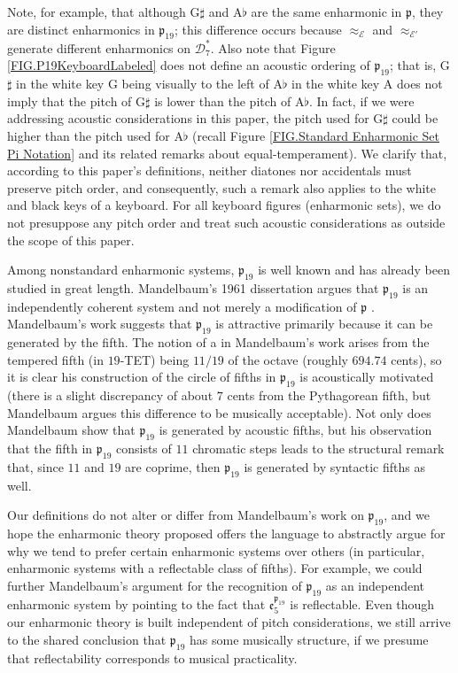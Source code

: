 \documentclass{article}
\theoremstyle{plain}
\theoremstyle{definition}
\theoremstyle{remark}
\begin{document}
Note, for example, that although $\textrm{G}\sharp$ and $\textrm{A}\flat$ are the same enharmonic in $\mathfrak{p}$, they are distinct enharmonics in $\mathfrak{p}_{19}$; this difference occurs because $\approx_\mathcal{E}$ and $\approx_{\mathcal{E}'}$ generate different enharmonics on $\mathcal{D}_7^\ast$. Also note that Figure \ref{FIG.P19KeyboardLabeled} does not define an acoustic ordering of $\mathfrak{p}_{19}$; that is, G$\sharp$ in the white key G being visually to the left of A$\flat$ in the white key A does not imply that the pitch of G$\sharp$ is lower than the pitch of A$\flat$. In fact, if we were addressing acoustic considerations in this paper, the pitch used for G$\sharp$ could be higher than the pitch used for A$\flat$ (recall Figure \ref{FIG.Standard Enharmonic Set Pi Notation} and its related remarks about equal-temperament). We clarify that, according to this paper's definitions, neither diatones nor accidentals must preserve pitch order, and consequently, such a remark also applies to the white and black keys of a keyboard. For all keyboard figures (enharmonic sets), we do not presuppose any pitch order and treat such acoustic considerations as outside the scope of this paper.

Among nonstandard enharmonic systems, $\mathfrak{p}_{19}$ is well known and has already been studied in great length. Mandelbaum's 1961 dissertation argues that $\mathfrak{p}_{19}$ is an independently coherent system and not merely a modification of $\mathfrak{p}$ \cite{Mandelbaum}. Mandelbaum's work suggests that $\mathfrak{p}_{19}$ is attractive primarily because it can be generated by the fifth. The notion of a  in Mandelbaum's work arises from the tempered fifth (in $19$-TET) being $11/19$ of the octave (roughly $694.74$ cents), so it is clear his construction of the circle of fifths in $\mathfrak{p}_{19}$ is acoustically motivated (there is a slight discrepancy of about $7$ cents from the Pythagorean fifth, but Mandelbaum argues this difference to be musically acceptable). Not only does Mandelbaum show that $\mathfrak{p}_{19}$ is generated by acoustic fifths, but his observation that the fifth in $\mathfrak{p}_{19}$ consists of $11$ chromatic steps leads to the structural remark that, since $11$ and $19$ are coprime, then $\mathfrak{p}_{19}$ is generated by syntactic fifths as well.

Our definitions do not alter or differ from Mandelbaum's work on $\mathfrak{p}_{19}$, and we hope the enharmonic theory proposed offers the language to abstractly argue for why we tend to prefer certain enharmonic systems over others (in particular, enharmonic systems with a reflectable class of fifths). For example, we could further Mandelbaum's argument for the recognition of $\mathfrak{p}_{19}$ as an independent enharmonic system by pointing to the fact that $\mathfrak{e}_5^{\mathfrak{p}_{19}}$ is reflectable. Even though our enharmonic theory is built independent of pitch considerations, we still arrive to the shared conclusion that $\mathfrak{p}_{19}$ has some musically  structure, if we presume that reflectability corresponds to musical practicality.
\end{document}
